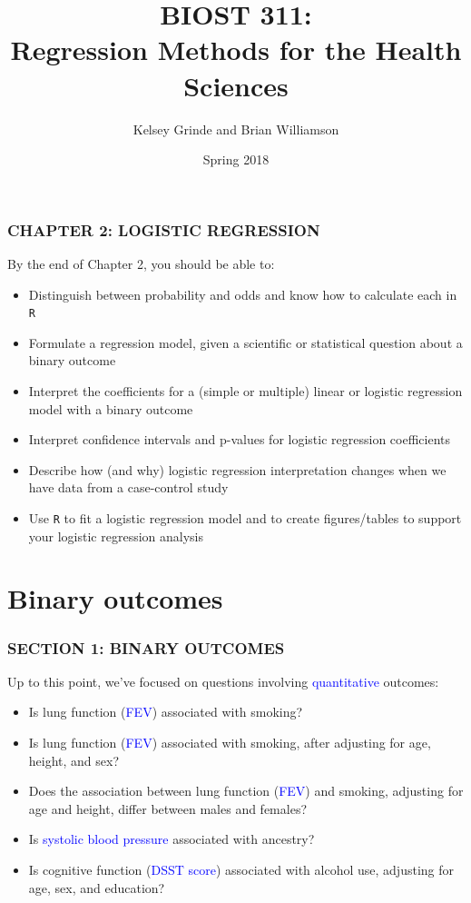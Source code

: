 \documentclass[12pt, 
hyperref={colorlinks=true, linkcolor=blue, urlcolor=cyan}]{beamer}
\title{BIOST 311: \\ Regression Methods for the Health Sciences}
\author{Kelsey Grinde and Brian Williamson}
\institute{UW Biostatistics}
\date{Spring 2018}
\begin{document}
\begin{frame}
\titlepage\thispagestyle{empty}
\end{frame}

  
\setcounter{framenumber}{\value{chap1}}

\begin{frame}
\frametitle{CHAPTER 2: LOGISTIC REGRESSION}

By the end of Chapter 2, you should be able to:
\begin{itemize}
\item Distinguish between probability and odds and know how to calculate each in \texttt{R}
\item Formulate a regression model, given a scientific or statistical question about a binary outcome
\item Interpret the coefficients for a (simple or multiple) linear or logistic regression model with a binary outcome
\item Interpret confidence intervals and p-values for logistic regression coefficients
\item Describe how (and why) logistic regression interpretation changes when we have data from a case-control study
\item Use \texttt{R} to fit a logistic regression model  and to create figures/tables to support your logistic regression analysis
\end{itemize}
\end{frame}

\section{Binary outcomes}
\begin{frame}
\frametitle{SECTION 1: BINARY OUTCOMES}
Up to this point, we've focused on questions involving \textcolor{blue}{quantitative} outcomes:

\begin{itemize}
\item Is lung function (\textcolor{blue}{FEV}) associated with smoking?
\item Is lung function (\textcolor{blue}{FEV}) associated with smoking, after adjusting for age, height, and sex?
\item Does the association between lung function (\textcolor{blue}{FEV}) and smoking, adjusting for age and height, differ between males and females?
\item Is \textcolor{blue}{systolic blood pressure} associated with ancestry?
\item Is cognitive function (\textcolor{blue}{DSST score}) associated with alcohol use, adjusting for age, sex, and education?
\end{itemize}
\end{frame}
\end{document}
